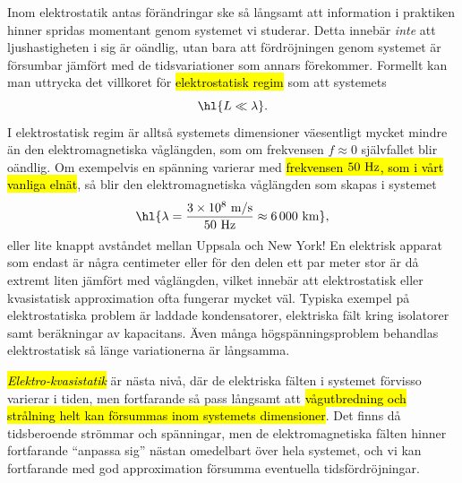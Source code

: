 {Inom elektrostatik antas f{\"o}r{\"a}ndringar ske s{\aa} l{\aa}ngsamt att
information i praktiken hinner spridas momentant genom systemet vi studerar.
Detta inneb{\"a}r {\it inte} att ljushastigheten i sig {\"a}r o{\"a}ndlig, utan
bara att f{\"o}rdr{\"o}jningen genom systemet {\"a}r f{\"o}rsumbar
j{\"a}mf{\"o}rt med de tidsvariationer som annars f{\"o}rekommer.
Formellt kan man uttrycka det villkoret f{\"o}r {\hl{elektrostatisk regim}}
som att systemets
$$
  \hl{L \ll \lambda}.
$$
I elektrostatisk regim {\"a}r allts{\aa} systemets dimensioner v{\"a}esentligt
mycket mindre {\"a}n den elektromagnetiska v{\aa}gl{\"a}ngden, som om
frekvensen $f\approx0$ sj{\"a}lvfallet blir o{\"a}ndlig.
Om exempelvis en sp{\"a}nning varierar med {\hl{frekvensen $50\ {\rm Hz}$,
som i v{\aa}rt vanliga eln{\"a}t}}, s{\aa} blir den elektromagnetiska
v{\aa}gl{\"a}ngden som skapas i systemet
$$
  \hl{\lambda = {{3 \times 10^8\ {\rm m}/{\rm s}}\over{50\ {\rm Hz}}}
    \approx 6\,000\ {\rm km}},
$$
eller lite knappt avst{\aa}ndet mellan Uppsala och New York!
En elektrisk apparat som endast {\"a}r n{\aa}gra centimeter eller f{\"o}r den
delen ett par meter stor {\"a}r d{\aa} extremt liten j{\"a}mf{\"o}rt med
v{\aa}gl{\"a}ngden, vilket inneb{\"a}r att elektrostatisk eller kvasistatisk
approximation ofta fungerar mycket v{\"a}l.
Typiska exempel p{\aa} elektrostatiska problem {\"a}r laddade kondensatorer,
elektriska f{\"a}lt kring isolatorer samt ber{\"a}kningar av kapacitans.
{\"A}ven m{\aa}nga h{\"o}gsp{\"a}nningsproblem behandlas elektrostatisk s{\aa}
l{\"a}nge variationerna {\"a}r l{\aa}ngsamma.

{\it{\hl{Elektro-kvasistatik}}} {\"a}r n{\"a}sta niv{\aa}, d{\"a}r de
elektriska f{\"a}lten i systemet f{\"o}rvisso varierar i tiden, men fortfarande
s{\aa} pass l{\aa}ngsamt att {\hl{v{\aa}gutbredning och str{\aa}lning helt kan
f{\"o}rsummas inom systemets dimensioner}}.
Det finns d{\aa} tidsberoende str{\"o}mmar och sp{\"a}nningar, men de
elektromagnetiska f{\"a}lten hinner fortfarande ``anpassa sig'' n{\"a}stan
omedelbart {\"o}ver hela systemet, och vi kan fortfarande med god approximation
f{\"o}rsumma eventuella tidsf{\"o}rdr{\"o}jningar.

}
